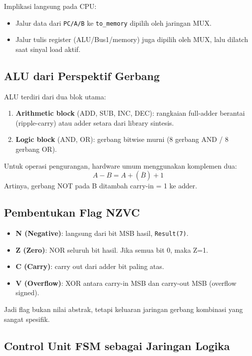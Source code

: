 \documentclass[12pt,a4paper]{report}
\begin{document}
Implikasi langsung pada CPU:
\begin{itemize}
  \item Jalur data dari \texttt{PC/A/B} ke \texttt{to\_memory} dipilih oleh jaringan MUX.
  \item Jalur tulis register (ALU/Bus1/memory) juga dipilih oleh MUX, lalu dilatch saat sinyal load aktif.
\end{itemize}

\subsection{ALU dari Perspektif Gerbang}

ALU terdiri dari dua blok utama:
\begin{enumerate}
  \item \textbf{Arithmetic block} (ADD, SUB, INC, DEC): rangkaian full-adder berantai (ripple-carry) atau adder setara dari library sintesis.
  \item \textbf{Logic block} (AND, OR): gerbang bitwise murni (8 gerbang AND / 8 gerbang OR).
\end{enumerate}

Untuk operasi pengurangan, hardware umum menggunakan komplemen dua:
\[
A - B = A + (\overline{B}) + 1
\]
Artinya, gerbang NOT pada B ditambah carry-in = 1 ke adder.

\subsection{Pembentukan Flag NZVC}

\begin{itemize}
  \item \textbf{N (Negative)}: langsung dari bit MSB hasil, \texttt{Result(7)}.
  \item \textbf{Z (Zero)}: NOR seluruh bit hasil. Jika semua bit 0, maka Z=1.
  \item \textbf{C (Carry)}: carry out dari adder bit paling atas.
  \item \textbf{V (Overflow)}: XOR antara carry-in MSB dan carry-out MSB (overflow signed).
\end{itemize}

Jadi flag bukan nilai abstrak, tetapi keluaran jaringan gerbang kombinasi yang sangat spesifik.

\subsection{Control Unit FSM sebagai Jaringan Logika}
\end{document}
